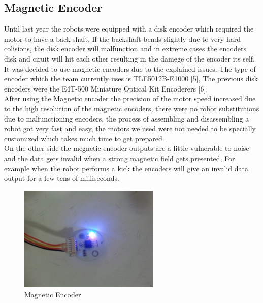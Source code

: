\subsection{Magnetic Encoder}
Until last year the robots were equipped with a disk encoder which required the motor to have a back shaft, If the backshaft bends slightly due to very hard colisions, the disk encoder will malfunction and in extreme cases the encoders disk and ciruit will hit each other resulting in the damege of the encoder its self.\\
It was decided to use magnetic encoders due to the explained issues. The type of encoder which the team currently uses is TLE5012B-E1000 [5], The previous disk encoders were the E4T-500 Miniature Optical Kit Encoderers [6].\\
After using the Magnetic encoder the precision of the motor speed increased due to the high resolution of the magnetic encoders, there were no robot substitutions due to malfunctioning encoders, the process of assembling and disassembling a robot got very fast and easy, the motors we used were not needed to be specially customized which takes much time to get prepared.\\
On the other side the megnetic encoder outputs are a little vulnerable to noise and the data gets invalid when a strong magnetic field gets presented, For example when the robot performs a kick the encoders will give an invalid data output for a few tens of milliseconds.\\




\begin{figure}
	\centering
	\includegraphics[width=0.6\textwidth]{images/MAG_ENC.jpg}
	\caption{Magnetic Encoder}
	\label{fig:MAG_ENC}
\end{figure}\\


